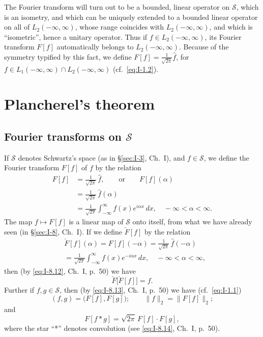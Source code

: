 The Fourier transform will turn out to be a bounded, linear operator on $\mathcal S$, which is an isometry, and which can be uniquely extended to a bounded linear operator on all of $L_{2}(-\infty,\infty)$, whose range coincides with $L_{2}(-\infty,\infty)$, and which is ``isometric'', hence a unitary operator. Thus if $f\in L_{2}(-\infty,\infty)$, its Fourier transform $F[f]$ automatically belongs to $L_{2}(-\infty,\infty)$. Because of the symmetry typified by this fact, we define $F[f]=\frac{1}{\sqrt{2\pi}}\hat f$, for $f\in L_{1}(-\infty,\infty)\cap L_{2}(-\infty,\infty)$ (cf.\ \eqref{eq:I-1.2}).

\section{Plancherel's theorem}
\label{sec:II-2}

\subsection*{Fourier transforms on $\mathcal S$}
\noindent If $\mathcal S$ denotes Schwartz's space (as in \S\ref{sec:I-3}, Ch.~I), and $f\in\mathcal S$, we define the Fourier transform $F[f]$ of $f$ by the relation
\begin{equation}\tag{2.1}\label{eq:II-2.1}
\begin{aligned}
F[f] &= \frac{1}{\sqrt{2\pi}}\,\hat f,\qquad\text{or}\qquad
F[f](\alpha)\\
&= \frac{1}{\sqrt{2\pi}}\,\hat f(\alpha)\\
&= \frac{1}{\sqrt{2\pi}}\int_{-\infty}^{\infty}f(x)e^{i\alpha x}\,dx,\quad-\infty<\alpha<\infty.
\end{aligned}
\end{equation}
The map $f\mapsto F[f]$ is a linear map of $\mathcal S$ onto itself, from what we have already seen (in \S\ref{sec:I-8}, Ch.~I). If we define $\check F[f]$ by the relation
\begin{equation}\tag{2.2}\label{eq:II-2.2}
\begin{aligned}
&\check F[f](\alpha) = F[f](-\alpha) = \frac{1}{\sqrt{2\pi}}\,\hat f(-\alpha)\\
&= \frac{1}{\sqrt{2\pi}}  \int_{-\infty}^{\infty}f(x)e^{-i\alpha x}\,dx,\quad - \infty < \alpha < \infty,
\end{aligned}
\end{equation}
then (by \eqref{eq:I-8.12}, Ch.~I, p.~50) we have
\begin{equation}\tag{2.3}\label{eq:II-2.3}
\check F\bigl[\check F[f]\bigr]=f.
\end{equation}
Further if $f,g\in\mathcal S$, then (by \eqref{eq:I-8.13}, Ch.~I, p.~50) we have (cf.\ \eqref{eq:I-1.1})
\begin{equation}\tag{2.4}\label{eq:II-2.4}
(f,g)=\bigl(F[f],F[g]\bigr);\qquad \|f\|_{2}=\|F[f]\|_{2};
\end{equation}
and
\begin{equation}\tag{2.5}\label{eq:II-2.5}
F[f*g]=\sqrt{2\pi}\,F[f]\cdot F[g],
\end{equation}
where the star ``*'' denotes convolution (see \eqref{eq:I-8.14}, Ch.~I, p.~50).

